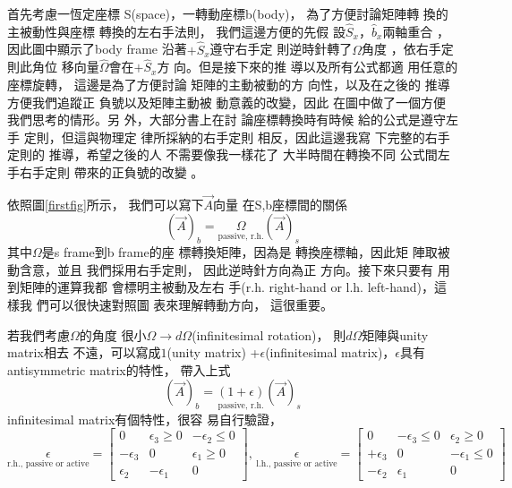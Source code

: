 \documentclass{article}
\begin{document}
首先考慮一恆定座標%
S(space)，一轉動座標b(body)，%
為了方便討論矩陣轉%
換的主被動性與座標%
轉換的左右手法則，%
我們這邊方便的先假%
設$\hat{S}_{x}， \hat{b}_{x}$兩軸重合%
，因此圖中顯示了body frame%
沿著$+\hat{S}_{x}$遵守右手定%
則逆時針轉了$\Omega $角度%
，依右手定則此角位%
移向量$\hat{\Omega}$會在$+\hat{S}_{x}$方%
向。但是接下來的推%
導以及所有公式都適%
用任意的座標旋轉，%
這邊是為了方便討論%
矩陣的主動被動的方%
向性，以及在之後的%
推導方便我們追蹤正%
負號以及矩陣主動被%
動意義的改變，因此%
在圖中做了一個方便%
我們思考的情形。另%
外，大部分書上在討%
論座標轉換時有時候%
給的公式是遵守左手%
定則，但這與物理定%
律所採納的右手定則%
相反，因此這邊我寫%
下完整的右手定則的%
推導，希望之後的人%
不需要像我一樣花了%
大半時間在轉換不同%
公式間左手右手定則%
帶來的正負號的改變%
。

\bigskip 依照圖\ref{firstfig}所示，%
我們可以寫下$\vec{A}$向量%
在S,b座標間的關係%
\begin{equation*}
\left( \vec{A}\right) _{b}=\underset{\text{passive, r.h.}}{\Omega }\left( 
\vec{A}\right) _{s}
\end{equation*}%
其中$\Omega $是s frame到b frame的座%
標轉換矩陣，因為是%
轉換座標軸，因此矩%
陣取被動含意，並且%
我們採用右手定則，%
因此逆時針方向為正%
方向。接下來只要有%
用到矩陣的運算我都%
會標明主被動及左右%
手(r.h. right-hand or l.h. left-hand)，這樣我%
們可以很快速對照圖%
表來理解轉動方向，%
這很重要。

若我們考慮$\Omega $的角度%
很小$\Omega \rightarrow d\Omega $(infinitesimal rotation)，%
則$d\Omega $矩陣與unity matrix相去%
不遠，可以寫成$1$(unity matrix) +$%
\epsilon $(infinitesimal matrix)，$\epsilon $具有%
antisymmetric matrix的特性\cite[p. 169]{goldstein}，%
帶入上式%
\begin{equation*}
\left( \vec{A}\right) _{b}=\underset{\text{passive, r.h.}}{\left( 1+\epsilon
\right) }\left( \vec{A}\right) _{s}
\end{equation*}%
infinitesimal matrix有個特性，很容%
易自行驗證，%
\begin{equation*}
\underset{\text{r.h., passive or active}}{\epsilon }=\left[ 
\begin{array}{ccc}
0 & \epsilon _{3}\geq 0 & -\epsilon _{2}\leq 0 \\ 
-\epsilon _{3} & 0 & \epsilon _{1}\geq 0 \\ 
\epsilon _{2} & -\epsilon _{1} & 0%
\end{array}%
\right] \text{, }\underset{\text{l.h., passive or active}}{\epsilon }=\left[ 
\begin{array}{ccc}
0 & -\epsilon _{3}\leq 0 & \epsilon _{2}\geq 0 \\ 
+\epsilon _{3} & 0 & -\epsilon _{1}\leq 0 \\ 
-\epsilon _{2} & \epsilon _{1} & 0%
\end{array}%
\right]
\end{equation*}
\end{document}
